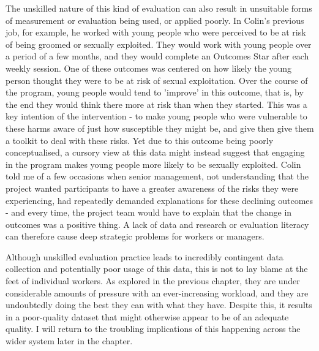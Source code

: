 The unskilled nature of this kind of evaluation can also result in unsuitable forms of measurement or evaluation being used, or applied poorly. In Colin's previous job, for example, he worked with young people who were perceived to be at risk of being groomed or sexually exploited. They would work with young people over a period of a few months, and they would complete an Outcomes Star after each weekly session. One of these outcomes was centered on how likely the young person thought they were to be at risk of sexual exploitation. Over the course of the program, young people would tend to 'improve' in this outcome, that is, by the end they would think there more at risk than when they started. This was a key intention of the intervention - to make young people who were vulnerable to these harms aware of just how susceptible they might be, and give then give them a toolkit to deal with these risks. Yet due to this outcome being poorly conceptualised, a cursory view at this data might instead suggest that engaging in the program makes young people more likely to be sexually exploited. Colin told me of a few occasions when senior management, not understanding that the project wanted participants to have a greater awareness of the risks they were experiencing, had repeatedly demanded explanations for these declining outcomes - and every time, the project team would have to explain that the change in outcomes was a positive thing. A lack of data and research or evaluation literacy can therefore cause deep strategic problems for workers or  managers.

Although unskilled evaluation practice leads to incredibly contingent data collection and potentially poor usage of this data, this is not to lay blame at the feet of individual workers. As explored in the previous chapter, they are under considerable amounts of pressure with an ever-increasing workload, and they are undoubtedly doing the best they can with what they have. Despite this, it results in a poor-quality dataset that might otherwise appear to be of an adequate quality. I will return to the troubling implications of this happening across the wider system later in the chapter.

